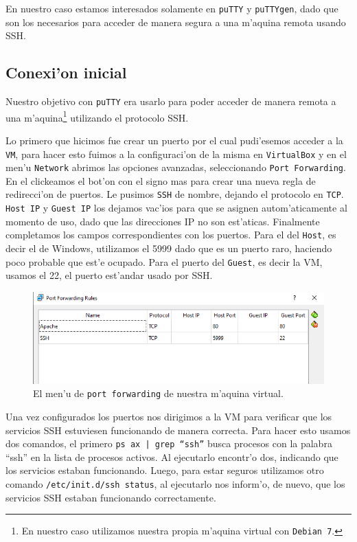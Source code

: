 \documentclass[11pt]{article}
\begin{document}
		En nuestro caso estamos interesados solamente en \texttt{puTTY} y \texttt{puTTYgen}, dado que son los necesarios para acceder de manera segura a una m'aquina remota usando SSH.
		
	
	\subsection{Conexi'on inicial}
		Nuestro objetivo con \texttt{puTTY} era usarlo para poder acceder de manera remota a una m'aquina\footnote{En nuestro caso utilizamos nuestra propia m'aquina virtual con \texttt{Debian 7}.} utilizando el protocolo SSH.
				
		Lo primero que hicimos fue crear un puerto por el cual pudi'esemos acceder a la \texttt{VM}, para hacer esto fuimos a la configuraci'on de la misma en \texttt{VirtualBox} y en el men'u \texttt{Network} abrimos las opciones avanzadas, seleccionando \texttt{Port Forwarding}. En el clickeamos el bot'on con el signo mas para crear una nueva regla de redirecci'on de puertos. Le pusimos \texttt{SSH} de nombre, dejando el protocolo en \texttt{TCP}. \texttt{Host IP} y \texttt{Guest IP} los dejamos vac'ios para que se asignen autom'aticamente al momento de uso, dado que las direcciones IP no son est'aticas. Finalmente completamos los campos correspondientes con los puertos. Para el del \texttt{Host}, es decir el de Windows, utilizamos el 5999 dado que es un puerto raro, haciendo poco probable que est'e ocupado. Para el puerto del \texttt{Guest}, es decir la VM, usamos el 22, el puerto est'andar usado por SSH.
		
		\begin{figure}[H]
    			\centering \captionsetup{justification=centering}
    			\includegraphics[scale=0.65]{Images/Install/port_forwarding.PNG}
    			\caption{El men'u de \texttt{port forwarding} de nuestra m'aquina virtual.}
    			\label{fig:port_forwarding}
		\end{figure}
		
		Una vez configurados los puertos nos dirigimos a la VM para verificar que los servicios SSH estuviesen funcionando de manera correcta. Para hacer esto usamos dos comandos, el primero \texttt{ps ax | grep ``ssh''} busca procesos con la palabra ``ssh'' en la lista de procesos activos. Al ejecutarlo encontr'o dos, indicando que los servicios estaban funcionando. Luego, para estar seguros utilizamos otro comando \texttt{/etc/init.d/ssh status}, al ejecutarlo nos inform'o, de nuevo, que los servicios SSH estaban funcionando correctamente. 
		
\end{document}
